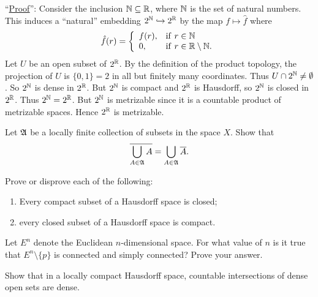\documentclass[12pt]{article}
\begin{document}
\noindent
``\underline{\sc Proof}'':
Consider the inclusion ${\Bbb N}\subseteq {\Bbb R}$, where
${\Bbb N}$ is the set of natural numbers. This induces a ``natural''
embedding $2^{\Bbb N}\hookrightarrow 2^{\Bbb R}$ by the map
$f\mapsto \hat{f}$ where
$$ \hat{f}(r)=\left\{ \begin{array}{ll}
    f(r),     & {\rm if}\ r\in {\Bbb N} \\
    0,        & {\rm if}\ r\in {\Bbb R}\setminus {\Bbb N}.
   \end{array} \right.  %
$$
Let $U$ be an open subset of $2^{\Bbb R}$.
By the definition of the product topology, the projection of $U$
is $\{ 0, 1\}=2$ in all but finitely many coordinates.
Thus $U\cap 2^{\Bbb N}\not =\emptyset $. So $2^{\Bbb N}$ is dense in
$2^{\Bbb R}$. But $2^{\Bbb N}$ is compact and $2^{\Bbb R}$ is Hausdorff,
so $2^{\Bbb N}$ is closed in $2^{\Bbb R}$.
Thus $2^{\Bbb N}=2^{\Bbb R}$. But $2^{\Bbb N}$ is metrizable
since it is a countable product of metrizable spaces.
Hence $2^{\Bbb R}$ is metrizable.

\vspace{12pt}
Let ${\frak A}$ be a locally finite collection of
subsets in the space $X$. Show that
$$ \overline{\bigcup_{A\in {\frak A}} A}
        = {\bigcup_{A\in {\frak A}} \overline{A}} . $$

\vspace{12pt}
Prove or disprove each of the following:
\begin{enumerate}
  \item Every compact subset of a Hausdorff space is closed;
  \item every closed subset of a Hausdorff space is compact.
\end{enumerate}


\vspace{12pt}
Let $E^n$ denote the Euclidean $n$-dimensional space. For what value
of $n$ is it true that $E^n\setminus \{p\}$ is connected and simply
connected? Prove your answer.

\vspace{12pt}
Show that in a locally compact Hausdorff space, countable intersections of
dense open sets are dense.
\end{document}
